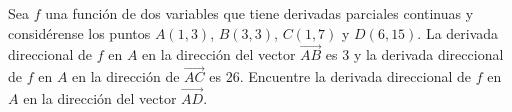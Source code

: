 \item Sea $f$ una función de dos variables que tiene derivadas parciales continuas y considérense los puntos $A(1, 3)$, $B(3, 3)$, $C(1, 7)$ y $D(6, 15)$. La derivada direccional de $f$ en $A$ en la dirección del vector $\vec{AB}$ es $3$ y la derivada direccional de $f$ en $A$ en la dirección de $\vec{AC}$ es $26$. Encuentre la derivada direccional de $f$ en $A$ en la dirección del vector $\vec{AD}$.
